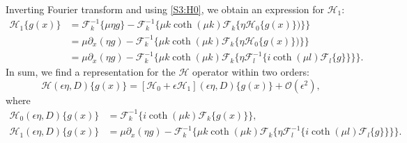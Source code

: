 \documentclass[11pt,reqno,oneside,a4paper]{article}
\begin{document}
Inverting Fourier transform and using \eqref{S3:H0}, we obtain an expression for $\mathcal{H}_1:$
\begin{align*}
\mathcal{H}_1 \{ g(x) \} &= \mathcal{F}^{-1}_k \{ \mu \eta g \} - \mathcal{F}^{-1}_k \{ \mu k \coth(\mu k) \mathcal{F}_k \{ \eta \mathcal{H}_0 \{ g(x) \}) \} \} \\
&= \mu \partial_x(\eta g) - \mathcal{F}^{-1}_k \{ \mu k \coth(\mu k) \mathcal{F}_k \{ \eta \mathcal{H}_0 \{ g(x) \}) \} \} \\
&= \mu \partial_x(\eta g) - \mathcal{F}^{-1}_k \{ \mu k \coth(\mu k) \mathcal{F}_k \{ \eta \mathcal{F}^{-1}_l \{i \coth(\mu l) \mathcal{F}_l\{g\} \} \} \}.
\end{align*}
In sum, we find a representation for the $\mathcal{H}$ operator within two orders:
\[ \mathcal{H}( \epsilon \eta, D)\{ g(x) \} = [ \mathcal{H}_0 + \epsilon \mathcal{H}_1]( \epsilon \eta, D)\{ g(x) \} + \mathcal{O}(\epsilon^2),\]
where 
\begin{align*}
\mathcal{H}_0( \epsilon \eta, D)\{ g(x) \} &= \mathcal{F}^{-1}_k\{i \coth(\mu k) \mathcal{F}_k\{g(x)\} \}, \\
\mathcal{H}_1( \epsilon \eta, D) \{ g(x) \} &= \mu \partial_x(\eta g) - \mathcal{F}^{-1}_k \{ \mu k \coth(\mu k) \mathcal{F}_k \{ \eta \mathcal{F}^{-1}_l\{i \coth(\mu l) \mathcal{F}_l\{g\}\} \} \}.
\end{align*}
\end{document}
